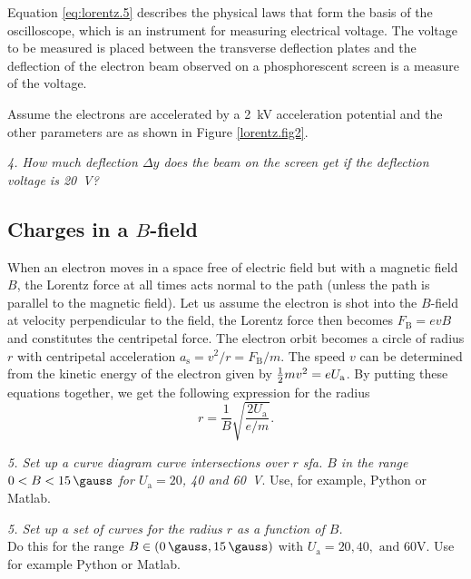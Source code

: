 \documentclass[../Elmag-labhefte-2020.tex]{subfiles}
\begin{document}
Equation \eqref{eq:lorentz.5} describes the physical laws that form the basis of the oscilloscope, which is an instrument for measuring electrical voltage. The voltage to be measured is placed between the transverse deflection plates and the deflection of the electron beam observed on a phosphorescent screen is a measure of the voltage.


Assume the electrons are accelerated by a \SI{2}{\kilo\volt} acceleration potential and the other parameters are as shown in Figure \ref{lorentz.fig2}.

\emph{ 4. How much deflection $\Delta y$ does the beam on the screen get if the deflection voltage is \SI{20}{\volt}?}

\subsection{Charges in a \(B\)-field}

When an electron moves in a space free of electric field but with a magnetic field $B$, the Lorentz force at all times acts normal to the path (unless the path is parallel to the magnetic field). Let us assume the electron is shot into the $B$-field at velocity perpendicular to the field, the Lorentz force then becomes $F_\mathrm{B} = evB$ and constitutes the centripetal force. The electron orbit becomes a circle of radius $r$ with centripetal acceleration $a_\mathrm{s} = v^2/r = F_\mathrm{B}/m$. The speed $v$ can be determined from the kinetic energy of the electron given by $\frac{1}{2} mv^2 = e U_\mathrm{a}$. By putting these equations together, we get the following expression for the radius
\begin{equation}
    r = \frac{1}{B} \sqrt{\frac{2 U_\mathrm{a}}{e/m}} .
    \label{eq:lorentz.6}
\end{equation}

\emph{ 5. Set up a curve diagram curve intersections over $r$ sfa. $B$ in the range $0 < B < \SI{15}{\gauss}$ for $U_\mathrm{a} = 20$, \num{40} and \SI{60}{\volt}}. Use, for example, Python or Matlab.

\emph{5. Set up a set of curves for the radius \(r\) as a function of \(B\).}\\
Do this for the range \(B \in (\SI{0}{\gauss}, \SI{15}{\gauss})\) with \(U_{\mathrm{a}} =20, 40, \text{ and } 60\si{\volt}\).
Use for example Python or Matlab.
\end{document}
